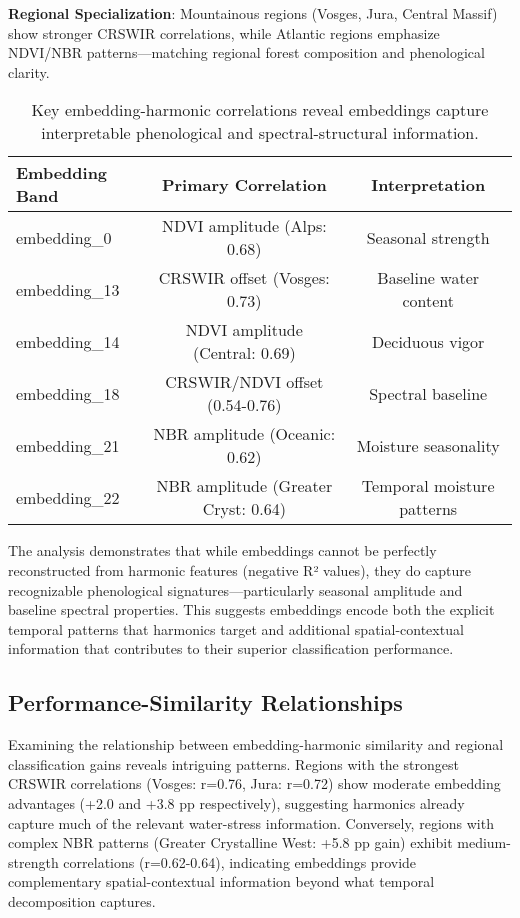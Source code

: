 \documentclass[utf8]{FrontiersinHarvard}
\begin{document}
\textbf{Regional Specialization}: Mountainous regions (Vosges, Jura, Central Massif) show stronger CRSWIR correlations, while Atlantic regions emphasize NDVI/NBR patterns—matching regional forest composition and phenological clarity.

\begin{table}[H]
\centering
\begin{tabular}{lcc}
\hline
\textbf{Embedding Band} & \textbf{Primary Correlation} & \textbf{Interpretation} \\ \hline
embedding\_0 & NDVI amplitude (Alps: 0.68) & Seasonal strength \\
embedding\_13 & CRSWIR offset (Vosges: 0.73) & Baseline water content \\
embedding\_14 & NDVI amplitude (Central: 0.69) & Deciduous vigor \\
embedding\_18 & CRSWIR/NDVI offset (0.54-0.76) & Spectral baseline \\
embedding\_21 & NBR amplitude (Oceanic: 0.62) & Moisture seasonality \\
embedding\_22 & NBR amplitude (Greater Cryst: 0.64) & Temporal moisture patterns \\ \hline
\end{tabular}
\caption{Key embedding-harmonic correlations reveal embeddings capture interpretable phenological and spectral-structural information.}
\label{tab:embedding_patterns}
\end{table}

The analysis demonstrates that while embeddings cannot be perfectly reconstructed from harmonic features (negative R² values), they do capture recognizable phenological signatures—particularly seasonal amplitude and baseline spectral properties. This suggests embeddings encode both the explicit temporal patterns that harmonics target and additional spatial-contextual information that contributes to their superior classification performance.

\subsection{Performance-Similarity Relationships}

Examining the relationship between embedding-harmonic similarity and regional classification gains reveals intriguing patterns. Regions with the strongest CRSWIR correlations (Vosges: r=0.76, Jura: r=0.72) show moderate embedding advantages (+2.0 and +3.8 pp respectively), suggesting harmonics already capture much of the relevant water-stress information. Conversely, regions with complex NBR patterns (Greater Crystalline West: +5.8 pp gain) exhibit medium-strength correlations (r=0.62-0.64), indicating embeddings provide complementary spatial-contextual information beyond what temporal decomposition captures.
\end{document}

